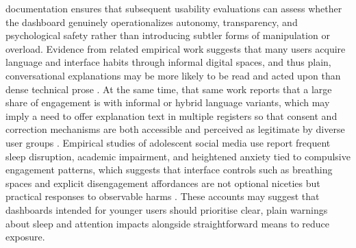 \documentclass{article}
\begin{document}
documentation ensures that subsequent usability evaluations can assess whether the dashboard genuinely operationalizes autonomy, transparency, and psychological safety rather than introducing subtler forms of manipulation or overload. Evidence from related empirical work suggests that many users acquire language and interface habits through informal digital spaces, and thus plain, conversational explanations may be more likely to be read and acted upon than dense technical prose \parencites[9]{3667034}. At the same time, that same work reports that a large share of engagement is with informal or hybrid language variants, which may imply a need to offer explanation text in multiple registers so that consent and correction mechanisms are both accessible and perceived as legitimate by diverse user groups \parencites[9]{3667034}. Empirical studies of adolescent social media use report frequent sleep disruption, academic impairment, and heightened anxiety tied to compulsive engagement patterns, which suggests that interface controls such as breathing spaces and explicit disengagement affordances are not optional niceties but practical responses to observable harms \parencites[5]{0818019}. These accounts may suggest that dashboards intended for younger users should prioritise clear, plain warnings about sleep and attention impacts alongside straightforward means to reduce exposure.
\end{document}
